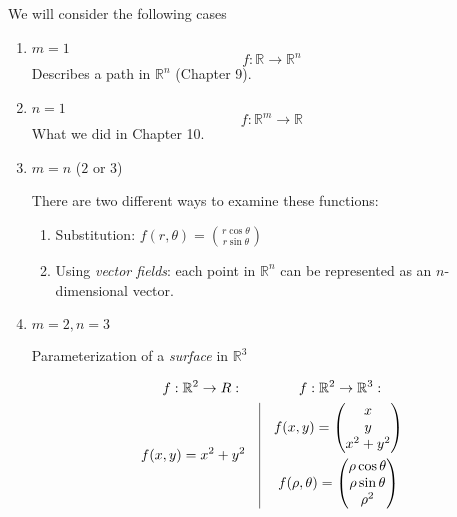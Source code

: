 \begin{example} We will consider the following cases
    \begin{enumerate}
        \item $m=1$
            $$f: \mathbb{R} \to \mathbb{R}^n$$
        Describes a path in $\mathbb{R}^n$ (Chapter 9).
        \item $n=1$
            $$f: \mathbb{R}^m \to \mathbb{R}$$
        What we did in Chapter 10.
        \item $m=n$ ($2$ or $3$)

            There are two different ways to examine these functions:
            \begin{enumerate}
                \item Substitution: $f(r,\theta)=\binom{r\cos\theta}{r\sin\theta}$
                \item Using \emph{vector fields}: each point in
                    $\mathbb{R}^n$ can be represented as an $n$-dimensional
                    vector.
            \end{enumerate}
        \item $m=2,n=3$

        Parameterization of a \emph{surface} in $\mathbb{R}^3$
        \begin{example}
            \begin{gather*}
           f:\mathbb{R}^2\to R: \qquad\qquad f:\mathbb{R}^2\to \mathbb{R}^3: \\
            \begin{gathered}
                f(x,y)=x^2+y^2
            \end{gathered} \quad \vline \quad \begin{gathered}
                f(x,y)=\begin{pmatrix}
                    x\\y\\x^2+y^2
                \end{pmatrix} \\
                f(\rho,\theta) =\begin{pmatrix}
                    \rho\cos\theta\\\rho\sin\theta\\\rho^2
                \end{pmatrix}
            \end{gathered}
            \end{gather*}
        \end{example}
    \end{enumerate}
\end{example}
